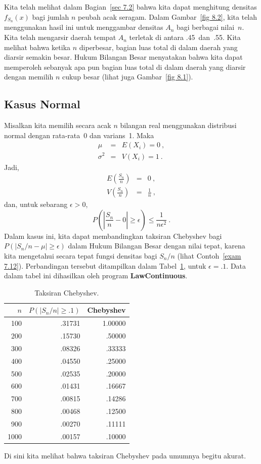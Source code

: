 {\begin{example}
Kita telah melihat dalam Bagian~\ref{sec 7.2} bahwa kita dapat menghitung densitas
$f_{S_n}(x)$ bagi jumlah $n$ peubah acak seragam.  Dalam Gambar~\ref{fig 8.2}, kita telah
menggunakan hasil ini untuk menggambar densitas $A_n$ bagi berbagai nilai~$n$.  Kita telah
mengarsir daerah tempat $A_n$ terletak di antara .45~dan~.55.  Kita melihat bahwa ketika
$n$ diperbesar, bagian luas total di dalam daerah yang diarsir semakin
besar.  Hukum Bilangan Besar menyatakan bahwa kita dapat memperoleh sebanyak apa pun
bagian luas total di dalam daerah yang diarsir dengan memilih $n$ cukup besar
(lihat juga Gambar~\ref{fig 8.1}).
\end{example}

\subsection*{Kasus Normal}
\begin{example}
Misalkan kita memilih secara acak $n$ bilangan real
menggunakan distribusi normal dengan rata-rata~0 dan varians~1.  Maka
\begin{eqnarray*}
         \mu &=& E(X_i) = 0\ , \\
    \sigma^2 &=& V(X_i) = 1\ .
\end{eqnarray*}
Jadi,
\begin{eqnarray*}
E \left( \frac {S_n}n \right) &=& 0\ , \\
V \left( \frac {S_n}n \right) &=& \frac 1n\ ,
\end{eqnarray*}
dan, untuk sebarang $\epsilon > 0$,
$$
P\left( \left| \frac {S_n}n - 0 \right| \geq \epsilon \right) \leq \frac
1{n\epsilon^2}\ .
$$
Dalam kasus ini, kita dapat membandingkan taksiran Chebyshev bagi $P(|S_n/n -
\mu| \geq \epsilon)$ dalam Hukum Bilangan Besar dengan nilai tepat, karena kita
mengetahui secara tepat fungsi densitas bagi $S_n/n$ (lihat Contoh~\ref{exam 7.12}). 
Perbandingan tersebut ditampilkan dalam Tabel~\ref{table 8.1}, untuk $\epsilon = .1$.  Data
dalam tabel ini dihasilkan oleh program {\bf LawContinuous}.
\begin{table}
\centering
\begin{tabular}{r|r|r}
$n$ & $P(|S_n/n| \ge .1)$ & Chebyshev \\
\hline
100 & .31731 & 1.00000 \\
200 & .15730 & .50000 \\
300 & .08326 & .33333 \\
400 & .04550 & .25000 \\
500 & .02535 & .20000 \\
600 & .01431 & .16667 \\
700 & .00815 & .14286 \\
800 & .00468 & .12500 \\
900 & .00270 & .11111 \\
1000 & .00157 & .10000 \\
\hline
\end{tabular}
\caption{Taksiran Chebyshev.}
\label{table 8.1}
\end{table}
Di sini kita melihat bahwa taksiran Chebyshev pada umumnya  begitu 
akurat.
\end{example}

}
